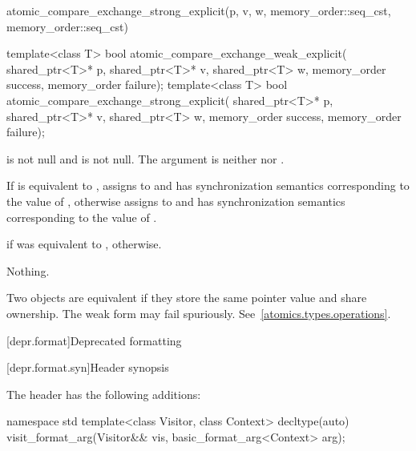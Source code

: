 \begin{itemdescr}
\pnum
\returns
\begin{codeblock}
atomic_compare_exchange_strong_explicit(p, v, w, memory_order::seq_cst,
                                        memory_order::seq_cst)
\end{codeblock}
\end{itemdescr}

%
%
\begin{itemdecl}
template<class T>
  bool atomic_compare_exchange_weak_explicit(
    shared_ptr<T>* p, shared_ptr<T>* v, shared_ptr<T> w,
    memory_order success, memory_order failure);
template<class T>
  bool atomic_compare_exchange_strong_explicit(
    shared_ptr<T>* p, shared_ptr<T>* v, shared_ptr<T> w,
    memory_order success, memory_order failure);
\end{itemdecl}

\begin{itemdescr}
\pnum
\expects
{} is not null and  is not null.
The  argument is neither  nor
.

\pnum
\effects
If  is equivalent to , assigns  to
 and has synchronization semantics corresponding to the value of
, otherwise assigns  to  and has
synchronization semantics corresponding to the value of .

\pnum
\returns
{} if  was equivalent to ,  otherwise.

\pnum
\throws
Nothing.

\pnum
\remarks
Two  objects are equivalent if they store the same
pointer value and share ownership.
The weak form may fail spuriously. See~\ref{atomics.types.operations}.
\end{itemdescr}

[depr.format]{Deprecated formatting}

[depr.format.syn]{Header  synopsis}

\pnum
The header  has the following additions:

\begin{codeblock}
namespace std {
  template<class Visitor, class Context>
    decltype(auto) visit_format_arg(Visitor&& vis, basic_format_arg<Context> arg);
}
\end{codeblock}

